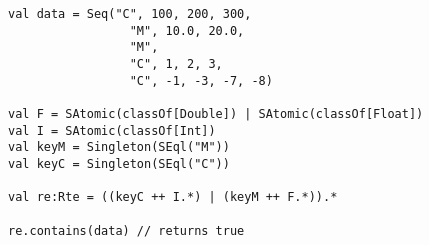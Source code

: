 \begin{lstlisting}[style=scalaioScala]
val data = Seq("C", 100, 200, 300,
                 "M", 10.0, 20.0,
                 "M",
                 "C", 1, 2, 3,
                 "C", -1, -3, -7, -8)

val F = SAtomic(classOf[Double]) | SAtomic(classOf[Float])
val I = SAtomic(classOf[Int])
val keyM = Singleton(SEql("M"))
val keyC = Singleton(SEql("C"))

val re:Rte = ((keyC ++ I.*) | (keyM ++ F.*)).*

re.contains(data) // returns true
\end{lstlisting}
